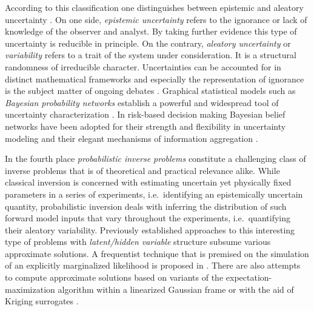 According to this classification one distinguishes between epistemic and aleatory uncertainty \cite{Uncertainty:Faber2005,Uncertainty:Kiureghian2009}.
On one side, \textit{epistemic uncertainty} refers to the ignorance or lack of knowledge of the observer and analyst.
By taking further evidence this type of uncertainty is reducible in principle.
On the contrary, \textit{aleatory uncertainty} or \textit{variability} refers to a trait of the system under consideration.
It is a structural randomness of irreducible character.
Uncertainties can be accounted for in distinct mathematical frameworks and especially the representation of ignorance is the subject matter of ongoing debates \cite{Uncertainty:Helton2004,Uncertainty:Helton2011}.
Graphical statistical models such as \textit{Bayesian probability networks} establish a powerful and widespread tool of uncertainty characterization \cite{Bayesian:Koski2009,Bayesian:Kjaerulff2013}.
In risk-based decision making Bayesian belief networks have been adopted for their strength and flexibility in uncertainty modeling \cite{Bayesian:Bayraktarli2011:a,Bayesian:Deublein2013}
and their elegant mechanisms of information aggregation \cite{Bayesian:Kelly2009,Bayesian:Urbina2012}.
\par %
In the fourth place \textit{probabilistic inverse problems} constitute a challenging class of inverse problems that is of theoretical and practical relevance alike.
While classical inversion is concerned with estimating uncertain yet physically fixed parameters in a series of experiments, i.e.\ identifying an epistemically uncertain quantity,
probabilistic inversion deals with inferring the distribution of such forward model inputs that vary throughout the experiments, i.e.\ quantifying their aleatory variability.
Previously established approaches to this interesting type of problems with \textit{latent/hidden variable} structure subsume various approximate solutions.
A frequentist technique that is premised on the simulation of an explicitly marginalized likelihood is proposed in \cite{Multilevel:Rocquigny2009}.
There are also attempts to compute approximate solutions based on variants of the expectation-maximization algorithm
within a linearized Gaussian frame \cite{Multilevel:Celeux2010} or with the aid of Kriging surrogates \cite{Multilevel:Barbillon2011}.
